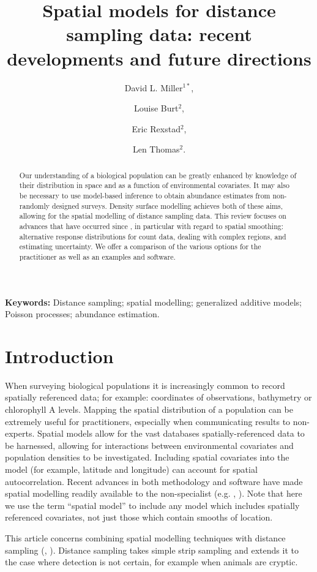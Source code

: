 \documentclass[a4paper,12pt]{article}
\title{Spatial models for distance sampling data: recent developments and future directions}
\author{
David L. Miller$^{1*}$, \and
Louise Burt$^{2}$, \and
Eric Rexstad$^{2}$, \and 
Len Thomas$^{2}$.}
\begin{document}
\maketitle

\begin{abstract}
  \noindent 
Our understanding of a biological population can be greatly enhanced by knowledge of their distribution in space and as a function of environmental covariates. It may also be necessary to use model-based inference to obtain abundance estimates from non-randomly designed surveys. Density surface modelling achieves both of these aims, allowing for the spatial modelling of distance sampling data. This review focuses on advances that have occurred since \cite{Hedley:2004et}, in particular with regard to spatial smoothing: alternative response distributions for count data, dealing with complex regions, and estimating uncertainty.  We offer a comparison of the various options for the practitioner as well as an examples and software.
\end{abstract}

\noindent \textbf{Keywords:} Distance sampling; spatial modelling; generalized additive models; Poisson processes; abundance estimation.


\newpage

\section*{Introduction}
\label{s:intro}

When surveying biological populations it is increasingly common to record spatially referenced data; for example: coordinates of observations, bathymetry or chlorophyll A levels. Mapping the spatial distribution of a population can be extremely useful for practitioners, especially when communicating results to non-experts. Spatial models allow for the vast databases spatially-referenced data to be harnessed, allowing for interactions between environmental covariates and population densities to be investigated. Including spatial covariates into the model (for example, latitude and longitude) can account for spatial autocorrelation. Recent advances in both methodology and software have made spatial modelling readily available to the non-specialist (e.g. \cite{Wood:2006wz}, \cite{Rue:2009tw}). Note that  here we use the term ``spatial model'' to include any model which includes spatially referenced covariates, not just those which contain smooths of location.

This article concerns combining spatial modelling techniques with distance sampling (\cite{Buckland:2001vm}, \cite{Buckland:2004ts}). Distance sampling takes simple strip sampling and extends it to the case where detection is not certain, for example when animals are cryptic. 
\end{document}

